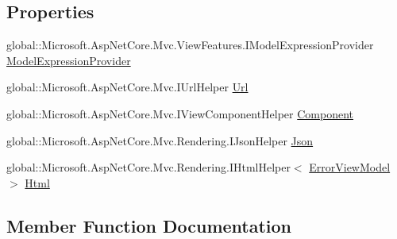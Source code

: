 \subsection*{Properties}
\begin{DoxyCompactItemize}
\item 
global\+::\+Microsoft.\+Asp\+Net\+Core.\+Mvc.\+View\+Features.\+I\+Model\+Expression\+Provider \mbox{\hyperlink{class_asp_net_core_1_1_views___shared___error_a42383ac95c491016358a37b215c6acd3}{Model\+Expression\+Provider}}
\item 
global\+::\+Microsoft.\+Asp\+Net\+Core.\+Mvc.\+I\+Url\+Helper \mbox{\hyperlink{class_asp_net_core_1_1_views___shared___error_abaf42ec8e35e72026480e49d001f84c2}{Url}}
\item 
global\+::\+Microsoft.\+Asp\+Net\+Core.\+Mvc.\+I\+View\+Component\+Helper \mbox{\hyperlink{class_asp_net_core_1_1_views___shared___error_aeea5446b7eaa954692ba83fa3be58726}{Component}}
\item 
global\+::\+Microsoft.\+Asp\+Net\+Core.\+Mvc.\+Rendering.\+I\+Json\+Helper \mbox{\hyperlink{class_asp_net_core_1_1_views___shared___error_a3faeeba018368097cc9a55dc55015c16}{Json}}
\item 
global\+::\+Microsoft.\+Asp\+Net\+Core.\+Mvc.\+Rendering.\+I\+Html\+Helper$<$ \mbox{\hyperlink{class_lizst_1_1_models_1_1_error_view_model}{Error\+View\+Model}} $>$ \mbox{\hyperlink{class_asp_net_core_1_1_views___shared___error_a103e565d3f056ac7e343f935c52f2c74}{Html}}
\end{DoxyCompactItemize}


\subsection{Member Function Documentation}
\mbox{\label{class_asp_net_core_1_1_views___shared___error_a3cdb89b5008b1f7058bd2493983c0356}} 

